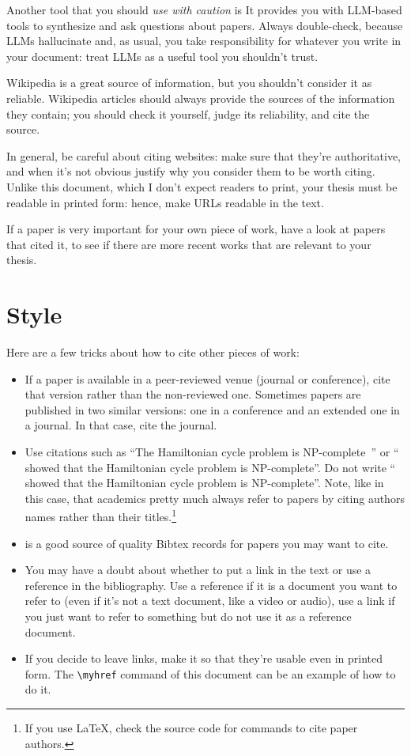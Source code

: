 Another tool that you should \emph{use with caution} is  It provides you with \ac{LLM}-based tools to synthesize and ask questions about papers. Always double-check, because \acp{LLM} hallucinate and, as usual, you take responsibility for whatever you write in your document: treat \acp{LLM} as a useful tool you shouldn't trust.

Wikipedia is a great source of information, but you shouldn't consider it as reliable.
Wikipedia articles should always provide the sources of the information they contain; you
should check it yourself, judge its reliability, and cite the source.

In general, be careful about citing websites: make sure that they're authoritative, and when it's not obvious justify why you consider them to be worth citing. Unlike this document, which I don't expect readers to print, your thesis must be readable in printed form: hence, make URLs readable in the text.

If a paper is very important for your own piece of work, have a look at papers
that cited it, to see if there are more recent works that are relevant to your thesis.

\section{Style}

Here are a few tricks about how to cite other pieces of work:
\begin{itemize}
  \item If a paper is available in a peer-reviewed venue (journal or conference), cite that
  version rather than the non-reviewed one. Sometimes papers are published in two similar
  versions: one in a conference and an extended one in a journal. In that case, cite the
  journal.
  \item Use citations such as ``The Hamiltonian cycle problem is
  NP-complete~\cite{DBLP:conf/coco/Karp72}'' or ``\textcite{DBLP:conf/coco/Karp72} showed
  that the Hamiltonian cycle problem is NP-complete''. Do not write
  ``\cite{DBLP:conf/coco/Karp72} showed that the Hamiltonian cycle problem is NP-complete''. Note, like in this case, that academics pretty much always refer to papers by citing authors names rather than their titles.\footnote{If you use \LaTeX, check the source code for commands to cite paper authors.}
  \item {} is a good source of quality Bibtex records for papers
  you may want to cite.
  \item You may have a doubt about whether to put a link in the text or use a reference in the bibliography. Use a reference if it is a document you want to refer to (even if it's not a text document, like a video or audio), use a link if you just want to refer to something but do not use it as a reference document.
  \item If you decide to leave links, make it so that they're usable even in printed form. The \verb|\myhref| command of this document can be an example of how to do it.
\end{itemize}

